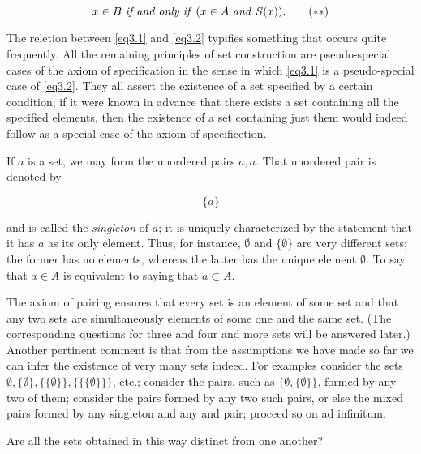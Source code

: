 \begin{equation}
\label{eq3.2}
x \in B \text{ \textit{if and only if} } (x \in A \text{ \textit{and} }  S(x)). \tag{$\ast \ast$}
\end{equation}

The reletion between \eqref{eq3.1} and \eqref{eq3.2} typifies something that occurs quite frequently. All the remaining principles of set construction are pseudo-special cases of the axiom of specification in the sense in which \eqref{eq3.1} is a pseudo-special case of \eqref{eq3.2}. They all assert the existence of a set specified by a certain condition; if it were known in advance that there exists a set containing all the specified elements, then the existence of a set containing just them would indeed follow as a special case of the axiom of specificetion. 

If $a$ is a set, we may form the unordered pairs ${a, a}$. That unordered pair is denoted by 

\begin{equation*}
\{ a \}
\end{equation*}

and is called the \textit{singleton} of $a$; it is uniquely characterized by the statement that it has $a$ as its only element. Thus, for instance, $ \emptyset $ and $ \{ \emptyset \}$ are very different sets; the former has no elements, whereas the latter has the unique element $ \emptyset $. To say that $a \in A$ is equivalent to saying that ${a} \subset A$. 

The axiom of pairing ensures that every set is an element of some set and that any two sets are simultaneously elements of some one and the same set. (The corresponding questions for three and four and more sets will be answered later.) Another pertinent comment is that from the assumptions we have made so far we can infer the existence of very many sets indeed. For examples  consider the sets $ \emptyset, \{ \emptyset \}, \{ \{ \emptyset \} \}, \{ \{ \{ \emptyset \} \} \} $, etc.; consider the pairs, such as  $ \{ \emptyset, \{ \emptyset \} \}$, formed by any two of them; consider the pairs formed by any two such pairs, or else the mixed pairs formed by any singleton and any and pair; proceed so on ad infinitum.

\begin{exercise} Are all the sets obtained in this way distinct from one another? 
\end{exercise}

